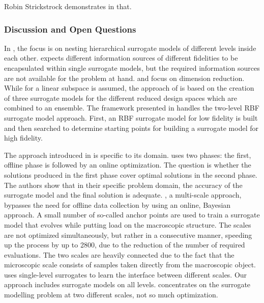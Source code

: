 \documentclass[preprint,12pt]{elsarticle}
\begin{document}
Robin Strickstrock demonstrates in  that.

\subsubsection{Discussion and Open Questions}

In \cite{han2012hierarchical}, the focus is on nesting hierarchical surrogate models of different levels inside each other. 
\cite{lam2015multifidelity} expects different information sources of different fidelities to be encapsulated within single surrogate models, but the required information sources are not available for the problem at hand.
\cite{cheng2020hierarchical} and \cite{ye2018ensemble} focus on dimension reduction. While for \cite{cheng2020hierarchical} a linear subspace is assumed, the approach of \cite{ye2018ensemble} is based on the creation of three surrogate models for the different reduced design spaces which are combined to an ensemble.
The framework presented in \cite{yi2020multi} handles the two-level RBF surrogate model approach. First, an RBF surrogate model for low fidelity is built and then searched to determine starting points for building a surrogate model for high fidelity.

The approach introduced in \cite{el2018multiscale} is specific to its domain.
\cite{yan2020efficient} uses two phases: the first, offline phase is followed by an online optimization. The question is whether the solutions produced in the first phase cover optimal solutions in the second phase. The authors show that in their specific problem domain, the accuracy of the surrogate model and the final solution is adequate. 
\cite{rocha2020fly}, a multi-scale approach, bypasses the need for offline data collection by using an online, Bayesian approach. A small number of so-called anchor points are used to train a surrogate model that evolves while putting load on the macroscopic structure. The scales are not optimized simultaneously, but rather in a consecutive manner, speeding up the process by up to 2800, due to the reduction of the number of required evaluations. The two scales are heavily connected due to the fact that the microscopic scale consists of samples taken directly from the macroscopic object.
\cite{wirtz2015surrogate} uses single-level surrogates to learn the interface between different scales. Our approach includes surrogate models on all levels. 
\cite{fritzen2019fly} concentrates on the surrogate modelling problem at two different scales, not so much optimization.
\end{document}
